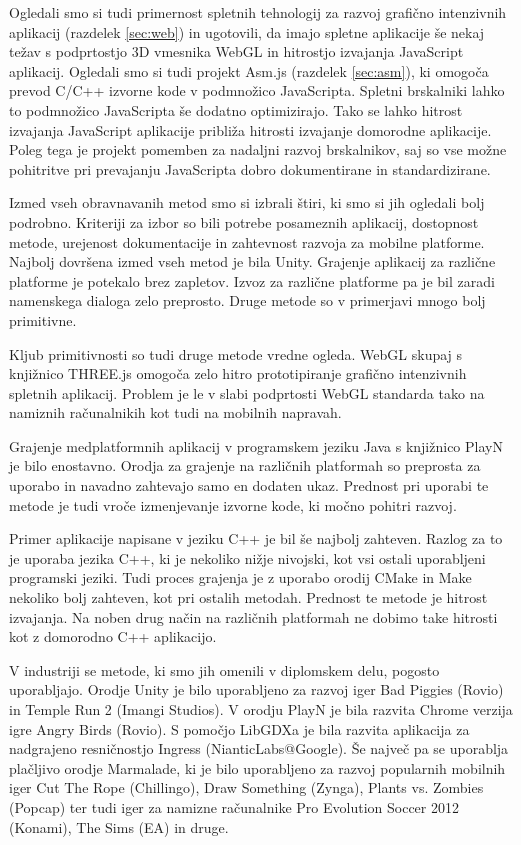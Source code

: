Ogledali smo si tudi primernost spletnih tehnologij za razvoj grafično intenzivnih aplikacij (razdelek \ref{sec:web}) in ugotovili, da imajo spletne aplikacije še nekaj težav s podprtostjo 3D vmesnika WebGL in hitrostjo izvajanja JavaScript aplikacij. Ogledali smo si tudi projekt Asm.js (razdelek \ref{sec:asm}), ki omogoča prevod C/C++ izvorne kode v podmnožico JavaScripta. Spletni brskalniki lahko to podmnožico JavaScripta še dodatno optimizirajo. Tako se lahko hitrost izvajanja JavaScript aplikacije približa hitrosti izvajanje domorodne aplikacije. Poleg tega je projekt pomemben za nadaljni razvoj brskalnikov, saj so vse možne pohitritve pri prevajanju JavaScripta dobro dokumentirane in standardizirane.

Izmed vseh obravnavanih metod smo si izbrali štiri, ki smo si jih ogledali bolj podrobno. Kriteriji za izbor so bili potrebe posameznih aplikacij, dostopnost metode, urejenost dokumentacije in zahtevnost razvoja za mobilne platforme. Najbolj dovršena izmed vseh metod je bila Unity. Grajenje aplikacij za različne platforme je potekalo brez zapletov. Izvoz za različne platforme pa je bil zaradi namenskega dialoga zelo preprosto. Druge metode so v primerjavi mnogo bolj primitivne.

Kljub primitivnosti so tudi druge metode vredne ogleda. WebGL skupaj s knjižnico THREE.js omogoča zelo hitro prototipiranje grafično intenzivnih spletnih aplikacij. Problem je le v slabi podprtosti WebGL standarda tako na namiznih računalnikih kot tudi na mobilnih napravah.

Grajenje medplatformnih aplikacij v programskem jeziku Java s knjižnico PlayN je bilo enostavno. Orodja za grajenje na različnih platformah so preprosta za uporabo in navadno zahtevajo samo en dodaten ukaz. Prednost pri uporabi te metode je tudi vroče izmenjevanje izvorne kode, ki močno pohitri razvoj. 

Primer aplikacije napisane v jeziku C++ je bil še najbolj zahteven. Razlog za to je uporaba jezika C++, ki je nekoliko nižje nivojski, kot vsi ostali uporabljeni programski jeziki. Tudi proces grajenja je z uporabo orodij CMake in Make nekoliko bolj zahteven, kot pri ostalih metodah. Prednost te metode je hitrost izvajanja. Na noben drug način na različnih platformah ne dobimo take hitrosti kot z domorodno C++ aplikacijo.

V industriji se metode, ki smo jih omenili v diplomskem delu, pogosto uporabljajo. Orodje Unity je bilo uporabljeno za razvoj iger Bad Piggies (Rovio) in Temple Run 2 (Imangi Studios). V orodju PlayN je bila razvita Chrome verzija igre Angry Birds (Rovio). S pomočjo LibGDXa je bila razvita aplikacija za nadgrajeno resničnostjo Ingress (NianticLabs@Google). Še največ pa se uporablja plačljivo orodje Marmalade, ki je bilo uporabljeno za razvoj popularnih mobilnih iger Cut The Rope (Chillingo), Draw Something (Zynga), Plants vs. Zombies (Popcap) ter tudi iger za namizne računalnike Pro Evolution Soccer 2012 (Konami), The Sims (EA) in druge.

